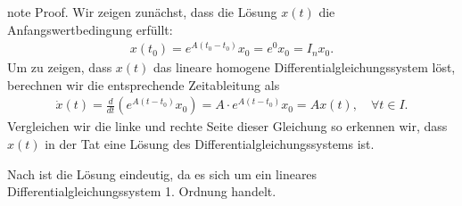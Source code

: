 \documentclass[letterpaper,10pt,english]{jupyterBook}
\begin{document}
\begin{sphinxadmonition}{note}
\sphinxAtStartPar
Proof. Wir zeigen zunächst, dass die Lösung \(x(t)\) die Anfangswertbedingung erfüllt:
\begin{equation*}
\begin{split}x(t_0) = e^{A(t_0-t_0)}x_0 = e^0x_0 = I_n x_0.\end{split}
\end{equation*}
\sphinxAtStartPar
Um zu zeigen, dass \(x(t)\) das lineare homogene Differentialgleichungssystem {\hyperref[\detokenize{ode/repetition:equation-eq-lin-hom-dglsystem}]{}} löst, berechnen wir die entsprechende Zeitableitung als
\begin{equation*}
\begin{split}\dot{x}(t) = \frac{d}{dt}(e^{A(t-t_0)}x_0) = A \cdot e^{A(t-t_0)}x_0 = A x(t), \quad \forall t \in I.\end{split}
\end{equation*}
\sphinxAtStartPar
Vergleichen wir die linke und rechte Seite dieser Gleichung so erkennen wir, dass \(x(t)\) in der Tat eine Lösung des Differentialgleichungssystems ist.

\sphinxAtStartPar
Nach {\hyperref[\detokenize{ode/repetition:cor:eindeutigkeit_linear}]{}} ist die Lösung eindeutig, da es sich um ein lineares Differentialgleichungssystem 1. Ordnung handelt.
\end{sphinxadmonition}
\end{document}
